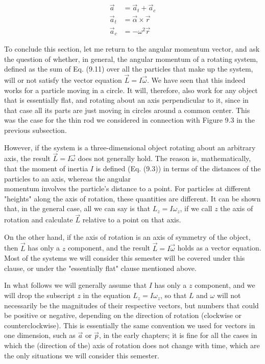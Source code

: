 \documentclass[10pt]{article}
\begin{document}
\begin{align*}
\vec{a} & =\vec{a}_{t}+\vec{a}_{c} \\
\vec{a}_{t} & =\vec{\alpha} \times \vec{r} \\
\vec{a}_{c} & =-\omega^{2} \vec{r} \tag{9.18}
\end{align*}


To conclude this section, let me return to the angular momentum vector, and ask the question of whether, in general, the angular momentum of a rotating system, defined as the sum of Eq. (9.11) over all the particles that make up the system, will or not satisfy the vector equation $\vec{L}=I \vec{\omega}$. We have seen that this indeed works for a particle moving in a circle. It will, therefore, also work for any object that is essentially flat, and rotating about an axis perpendicular to it, since in that case all its parts are just moving in circles around a common center. This was the case for the thin rod we considered in connection with Figure 9.3 in the previous subsection.

However, if the system is a three-dimensional object rotating about an arbitrary axis, the result $\vec{L}=I \vec{\omega}$ does not generally hold. The reason is, mathematically, that the moment of inertia $I$ is defined (Eq. (9.3)) in terms of the distances of the particles to an axis, whereas the angular\\
momentum involves the particle's distance to a point. For particles at different "heights" along the axis of rotation, these quantities are different. It can be shown that, in the general case, all we can say is that $L_{z}=I \omega_{z}$, if we call $z$ the axis of rotation and calculate $\vec{L}$ relative to a point on that axis.

On the other hand, if the axis of rotation is an axis of symmetry of the object, then $\vec{L}$ has only a $z$ component, and the result $\vec{L}=I \vec{\omega}$ holds as a vector equation. Most of the systems we will consider this semester will be covered under this clause, or under the "essentially flat" clause mentioned above.

In what follows we will generally assume that $I$ has only a $z$ component, and we will drop the subscript $z$ in the equation $L_{z}=I \omega_{z}$, so that $L$ and $\omega$ will not necessarily be the magnitudes of their respective vectors, but numbers that could be positive or negative, depending on the direction of rotation (clockwise or counterclockwise). This is essentially the same convention we used for vectors in one dimension, such as $\vec{a}$ or $\vec{p}$, in the early chapters; it is fine for all the cases in which the (direction of the) axis of rotation does not change with time, which are the only situations we will consider this semester.
\end{document}
